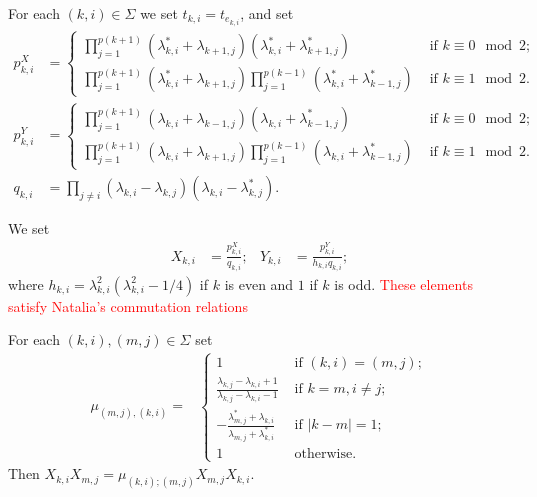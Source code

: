 \documentclass[11pt,fleqn]{amsart}
\begin{document}
For each $(k,i) \in \Sigma$ we set $t_{k,i} = t_{e_{k,i}}$, and set
\begin{align*}
p^X_{k,i}
	&= \begin{cases}
		\displaystyle
		\prod_{j=1}^{p(k+1)} (\lambda_{k,i}^* + \lambda_{k+1,j})
			(\lambda_{k,i}^* + \lambda_{k+1,j}^*)
			& \mbox{ if } k \equiv 0 \mod 2; \\
		\displaystyle
		\prod_{j=1}^{p(k+1)} (\lambda_{k,i}^* + \lambda_{k+1,j})
			\prod_{j=1}^{p(k-1)}(\lambda_{k,i}^* + \lambda_{k-1,j}^*)
			& \mbox{ if } k \equiv 1 \mod 2.
	\end{cases} \\
p^Y_{k,i}
	&= \begin{cases}
		\displaystyle
		\prod_{j=1}^{p(k+1)} (\lambda_{k,i} + \lambda_{k-1,j})
			(\lambda_{k,i} + \lambda_{k-1,j}^*)
			& \mbox{ if } k \equiv 0 \mod 2; \\
		\displaystyle
		\prod_{j=1}^{p(k+1)} (\lambda_{k,i} + \lambda_{k+1,j})
			\prod_{j=1}^{p(k-1)}(\lambda_{k,i} + \lambda_{k-1,j}^*)
			& \mbox{ if } k \equiv 1 \mod 2.
	\end{cases} \\
q_{k,i}
	&= 
		\displaystyle
	\prod_{j\neq i} (\lambda_{k,i} - \lambda_{k,j})
		(\lambda_{k,i} - \lambda_{k,j}^*).
\end{align*}

We set
\begin{align*}
X_{k,i}
	&= \frac{p_{k,i}^X}{q_{k,i}};
	&Y_{k,i}
	&= \frac{p_{k,i}^Y}{h_{k,i} q_{k,i}};
\end{align*}
where $h_{k,i} = \lambda_{k,i}^2 (\lambda_{k,i}^2 -1/4)$ if $k$ is even and
$1$ if $k$ is odd.
\textcolor{red}{These elements satisfy Natalia's commutation relations}

For each $(k,i), (m,j) \in \Sigma$ set
\begin{align*}
\mu_{(m,j),(k,i)}
	= &\begin{cases}
		1 
			& \mbox{ if } (k,i) = (m,j); \\
		\frac{\lambda_{k,j}-\lambda_{k,i}+1}{\lambda_{k,j}-\lambda_{k,i}-1}
			& \mbox{ if } k = m, i \neq j; \\
		-\frac{\lambda_{m,j}^*+\lambda_{k,i}}{\lambda_{m,j}+\lambda_{k,i}^*}
			& \mbox{ if } |k-m| = 1; \\
		1 
			& \mbox{ otherwise}.
	\end{cases}
\end{align*}
Then $X_{k,i} X_{m,j} = \mu_{(k,i);(m,j)} X_{m,j} X_{k,i}$.
\end{document}
